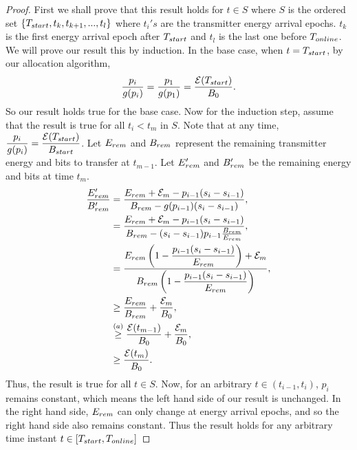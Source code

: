 \begin{proof}
First we shall prove that this result holds for $t\in S$ where $S$ is the ordered set $\{T_{\mbox{\scriptsize{start}}},t_k,t_{k+1},...,t_l\}$ where $t_i's$ are the transmitter energy arrival epochs. $t_k$ is the first energy arrival epoch after $T_{\mbox{\scriptsize{start}}}$ and $t_l$ is the last one before $T_{\mbox{\scriptsize{online}}}$. 
We will prove our result this by induction. In the base case, when $t = T_{\mbox{\scriptsize{start}}}$, by our allocation algorithm,
\begin{equation}
\dfrac{p_i}{g(p_i)} = \dfrac{p_1}{g(p_1)} = \dfrac{\ETx(T_{\mbox{\scriptsize{start}}})}{B_0}.
\end{equation}
So our result holds true for the base case. Now for the induction step, assume that the result is true for all $t_i<t_m$ in $S$. Note that at any time, $\dfrac{p_i}{g(p_i)} = \dfrac{\ETx(T_{\mbox{\scriptsize{start}}})}{B_{\mbox{\scriptsize{start}}}}$. Let $E_{\mbox{\scriptsize{rem}}}$ and $B_{\mbox{\scriptsize{rem}}}$ represent the remaining transmitter energy and bits to transfer at $t_{m-1}$. Let  $E_{\mbox{\scriptsize{rem}}}'$ and $B_{\mbox{\scriptsize{rem}}}'$ be the remaining energy and bits at time $t_m$. 
\begin{align}
\dfrac{E_{\mbox{\scriptsize{rem}}}'}{B_{\mbox{\scriptsize{rem}}}'} &= \dfrac{E_{\mbox{\scriptsize{rem}}} + \ETx_m - p_{i-1}(s_i-s_{i-1})}{B_{\mbox{\scriptsize{rem}}} - g(p_{i-1})(s_i-s_{i-1})},
\\
&= \dfrac{E_{\mbox{\scriptsize{rem}}} + \ETx_m - p_{i-1}(s_i-s_{i-1})}{B_{\mbox{\scriptsize{rem}}} - (s_i-s_{i-1})p_{i-1}\frac{B_{\mbox{\scriptsize{rem}}}}{E_{\mbox{\scriptsize{rem}}}}},
\\
&= \dfrac{E_{\mbox{\scriptsize{rem}}}\left(1 - \dfrac{p_{i-1}(s_i-s_{i-1})}{E_{\mbox{\scriptsize{rem}}}}\right) + \ETx_m}{B_{\mbox{\scriptsize{rem}}}\left(1 - \dfrac{p_{i-1}(s_i-s_{i-1})}{E_{\mbox{\scriptsize{rem}}}}\right)},
\\
&\ge \dfrac{E_{\mbox{\scriptsize{rem}}}}{B_{\mbox{\scriptsize{rem}}}} + \dfrac{\ETx_m}{B_0},
\\
&\stackrel{(a)}{\ge} \dfrac{\ETx(t_{m-1})}{B_0} + \dfrac{\ETx_m}{B_0},
\\
&\ge \dfrac{\ETx(t_m)}{B_0}.
\end{align}
Thus, the result is true for all $t\in S$. Now, for an arbitrary $t\in(t_{i-1},t_{i})$, $p_i$ remains constant, which means the left hand side of our result is unchanged. In the right hand side, $E_{\mbox{\scriptsize{rem}}}$ can only change at energy arrival epochs, and so the right hand side also remains constant. Thus the result holds for any arbitrary time instant $t \in [T_{\mbox{\scriptsize{start}}},T_{\mbox{\scriptsize{online}}}]$
\end{proof}


